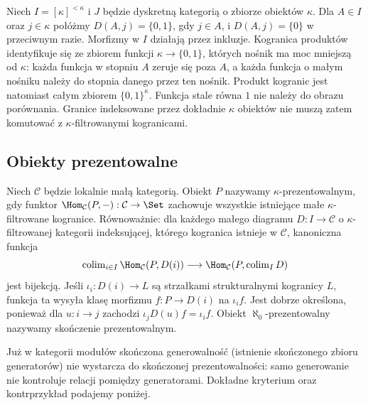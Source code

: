 \begin{przyklad}\label{cat:ex:accessible-filtered-limit-failure}
Niech $I=[\kappa]^{<\kappa}$ i $J$ będzie dyskretną kategorią o zbiorze obiektów $\kappa$. Dla $A\in I$ oraz $j\in\kappa$ połóżmy $D(A,j)=\{0,1\}$, gdy $j\in A$, i $D(A,j)=\{0\}$ w przeciwnym razie. Morfizmy w $I$ działają przez inkluzje. Kogranica produktów identyfikuje się ze zbiorem funkcji $\kappa\to\{0,1\}$, których nośnik ma moc mniejszą od $\kappa$: każda funkcja w stopniu $A$ zeruje się poza $A$, a każda funkcja o małym nośniku należy do stopnia danego przez ten nośnik. Produkt kogranic jest natomiast całym zbiorem $\{0,1\}^\kappa$. Funkcja stale równa $1$ nie należy do obrazu porównania. Granice indeksowane przez dokładnie $\kappa$ obiektów nie muszą zatem komutować z $\kappa$-filtrowanymi kogranicami.
\end{przyklad}

\subsection{Obiekty prezentowalne}

\begin{definicja}\label{cat:def:accessible-presentable-object}
Niech $\mathcal C$ będzie lokalnie małą kategorią. Obiekt $P$ nazywamy $\kappa$-prezentowalnym, gdy funktor $\Hom_{\mathcal C}(P,-):\mathcal C\to\Set$ zachowuje wszystkie istniejące małe $\kappa$-filtrowane kogranice. Równoważnie: dla każdego małego diagramu $D:I\to\mathcal C$ o $\kappa$-filtrowanej kategorii indeksującej, którego kogranica istnieje w $\mathcal C$, kanoniczna funkcja
\begin{equation}\label{cat:eq:accessible-hom-colim}
 \operatorname{colim}_{i\in I}\Hom_{\mathcal C}(P,D(i))
 \longrightarrow \Hom_{\mathcal C}(P,\operatorname{colim}_I D)
\end{equation}
jest bijekcją. Jeśli $\iota_i:D(i)\to L$ są strzałkami strukturalnymi kogranicy $L$, funkcja ta wysyła klasę morfizmu $f:P\to D(i)$ na $\iota_i f$. Jest dobrze określona, ponieważ dla $u:i\to j$ zachodzi $\iota_j D(u)f=\iota_i f$. Obiekt $\aleph_0$-prezentowalny nazywamy skończenie prezentowalnym.
\end{definicja}

Już w kategorii modułów skończona generowalność (istnienie skończonego zbioru generatorów) nie wystarcza do skończonej prezentowalności: samo generowanie nie kontroluje relacji pomiędzy generatorami. Dokładne kryterium oraz kontrprzykład podajemy poniżej.

